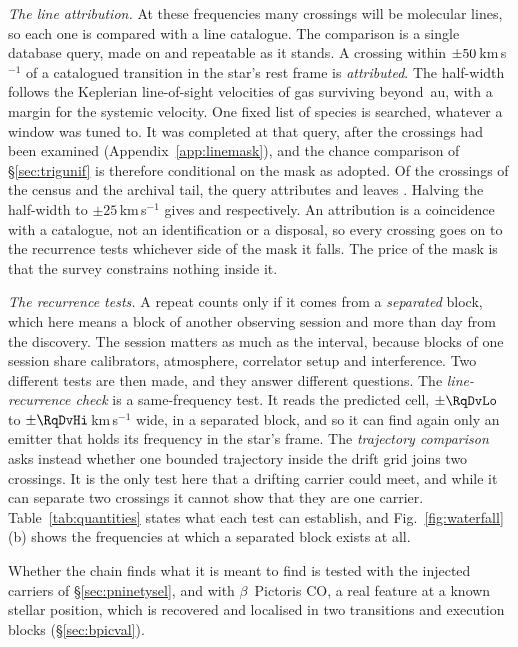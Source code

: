 \emph{The line attribution.} At these frequencies many crossings will be
molecular lines, so each one is compared with a line catalogue. The
comparison is a single database query, made on \MkListDate{} and repeatable
as it stands. A crossing within $\pm50$\,km\,s$^{-1}$ of a
catalogued transition in the star's rest frame is \emph{attributed}. The
half-width follows the Keplerian line-of-sight velocities of gas surviving
beyond \EcKepRAu\,au, with a margin for the systemic velocity. One fixed list of
\FrNSpec{} species is searched, whatever a window was tuned to. It was
completed at that query, after the crossings had been examined
(Appendix~\ref{app:linemask}), and the chance comparison of
\S\ref{sec:trigunif} is therefore conditional on the mask as adopted. Of the
\CnCross{} crossings of the census and the archival tail, the query attributes
\FrAttrWFifty{} and leaves \FrUnattrWFifty. Halving the half-width to
$\pm25$\,km\,s$^{-1}$ gives \FrAttrWTwentyFive{} and \FrUnattrWTwentyFive{}
respectively.
An attribution is a coincidence with a catalogue, not an identification or a
disposal, so every crossing goes on to the recurrence tests whichever side of
the mask it falls. The price of the mask is that the survey constrains
nothing inside it.

\emph{The recurrence tests.} A repeat counts only if it comes from a
\emph{separated} block, which here means a block of another observing session
and more than \EpSep{} day from the discovery. The session matters as much as
the interval, because blocks of one session share calibrators, atmosphere,
correlator setup and interference. Two different tests are then made, and
they answer different questions. The \emph{line-recurrence check} is a
same-frequency test. It reads the predicted cell, $\pm\RqDvLo$ to
$\pm\RqDvHi$\,km\,s$^{-1}$ wide, in a separated block, and so it can find
again only an emitter that holds its frequency in the star's frame. The
\emph{trajectory comparison} asks instead whether one bounded trajectory
inside the drift grid joins two crossings. It is the only test here that a
drifting carrier could meet, and while it can separate two crossings it
cannot show that they are one carrier. Table~\ref{tab:quantities} states what
each test can establish, and Fig.~\ref{fig:waterfall}(b) shows the frequencies
at which a separated block exists at all.

Whether the chain finds what it is meant to find is tested with the injected
carriers of \S\ref{sec:pninetysel}, and with $\beta$~Pictoris CO, a real
feature at a known stellar position, which is recovered and localised in two
transitions and \CsBpCoBlocks{} execution blocks (\S\ref{sec:bpicval}).


